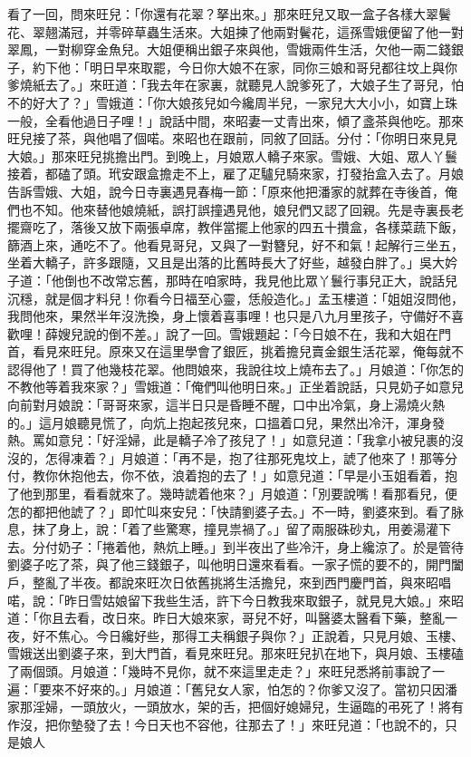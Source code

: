 看了一回，問來旺兒：「你還有花翠？拏出來。」那來旺兒又取一盒子各樣大翠鬢花、翠翹滿冠，并零碎草蟲生活來。大姐揀了他兩對鬢花，這孫雪娥便留了他一對翠鳳，一對柳穿金魚兒。大姐便稱出銀子來與他，雪娥兩件生活，欠他一兩二錢銀子，約下他：「明日早來取罷，今日你大娘不在家，同你三娘和哥兒都往坟上與你爹燒紙去了。」來旺道：「我去年在家裏，就聽見人說爹死了，大娘子生了哥兒，怕不的好大了？」雪娥道：「你大娘孩兒如今纔周半兒，一家兒大大小小，如寶上珠一般，全看他過日子哩！」說話中間，來昭妻一丈青出來，傾了盞茶與他吃。那來旺兒接了茶，與他唱了個喏。來昭也在跟前，同敘了回話。分付：「你明日來見見大娘。」那來旺兒挑擔出門。到晚上，月娘眾人轎子來家。雪娥、大姐、眾人丫鬟接着，都磕了頭。玳安跟盒擔走不上，雇了疋驢兒騎來家，打發抬盒入去了。月娘告訴雪娥、大姐，說今日寺裏遇見春梅一節：「原來他把潘家的就葬在寺後首，俺們也不知。他來替他娘燒紙，誤打誤撞遇見他，娘兒們又認了回親。先是寺裏長老擺齋吃了，落後又放下兩張卓席，教伴當擺上他家的四五十攢盒，各樣菜蔬下飯，篩酒上來，通吃不了。他看見哥兒，又與了一對簪兒，好不和氣！起解行三坐五，坐着大轎子，許多跟隨，又且是出落的比舊時長大了好些，越發白胖了。」吳大妗子道：「他倒也不改常忘舊，那時在咱家時，我見他比眾丫鬟行事兒正大，說話兒沉穩，就是個才料兒！你看今日福至心靈，恁般造化。」孟玉樓道：「姐姐沒問他，我問他來，果然半年沒洗換，身上懷着喜事哩！也只是八九月里孩子，守備好不喜歡哩！薛嫂兒說的倒不差。」說了一回。雪娥題起：「今日娘不在，我和大姐在門首，看見來旺兒。原來又在這里學會了銀匠，挑着擔兒賣金銀生活花翠，俺每就不認得他了！買了他幾枝花翠。他問娘來，我說往坟上燒布去了。」月娘道：「你怎的不教他等着我來家？」雪娥道：「俺們叫他明日來。」正坐着說話，只見奶子如意兒向前對月娘說：「哥哥來家，這半日只是昏睡不醒，口中出冷氣，身上湯燒火熱的。」這月娘聽見慌了，向炕上抱起孩兒來，口搵着口兒，果然出冷汗，渾身發熱。罵如意兒：「好淫婦，此是轎子冷了孩兒了！」如意兒道：「我拿小被兒裹的沒沒的，怎得凍着？」月娘道：「再不是，抱了往那死鬼坟上，諕了他來了！那等分付，教你休抱他去，你不依，浪着抱的去了！」如意兒道：「早是小玉姐看着，抱了他到那里，看看就來了。幾時諕着他來？」月娘道：「別要說嘴！看那看兒，便怎的都把他諕了？」即忙叫來安兒：「快請劉婆子去。」不一時，劉婆來到。看了脉息，抹了身上，說：「着了些驚寒，撞見祟禍了。」留了兩服硃砂丸，用姜湯灌下去。分付奶子：「捲着他，熱炕上睡。」到半夜出了些冷汗，身上纔涼了。於是管待劉婆子吃了茶，與了他三錢銀子，叫他明日還來看看。一家子慌的要不的，開門闔戶，整亂了半夜。都說來旺次日依舊挑將生活擔兒，來到西門慶門首，與來昭唱喏，說：「昨日雪姑娘留下我些生活，許下今日教我來取銀子，就見見大娘。」來昭道：「你且去看，改日來。昨日大娘來家，哥兒不好，叫醫婆太醫看下藥，整亂一夜，好不焦心。今日纔好些，那得工夫稱銀子與你？」正說着，只見月娘、玉樓、雪娥送出劉婆子來，到大門首，看見來旺兒。那來旺兒扒在地下，與月娘、玉樓磕了兩個頭。月娘道：「幾時不見你，就不來這里走走？」來旺兒悉將前事說了一遍：「要來不好來的。」月娘道：「舊兒女人家，怕怎的？你爹又沒了。當初只因潘家那淫婦，一頭放火，一頭放水，架的舌，把個好媳婦兒，生逼臨的弔死了！將有作沒，把你墊發了去！今日天也不容他，往那去了！」來旺兒道：「也說不的，只是娘人